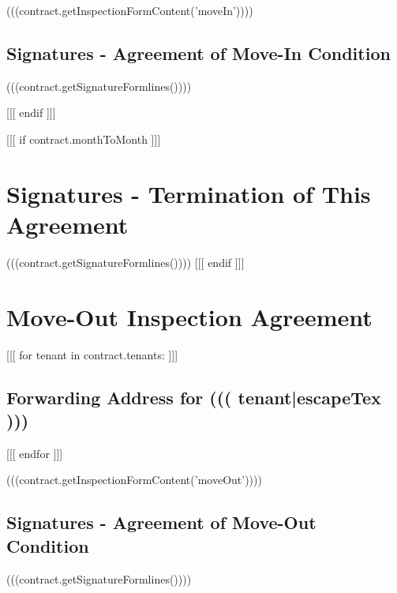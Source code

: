             (((contract.getInspectionFormContent('moveIn'))))
            
            \subsection{Signatures - Agreement of Move-In Condition}
                (((contract.getSignatureFormlines())))

    [[[ endif ]]]
    

    [[[ if contract.monthToMonth ]]]
        \pagebreak
        \section{Signatures - Termination of This Agreement}
            \label{terminationSignatures}
            (((contract.getSignatureFormlines())))
    [[[ endif ]]]

    \pagebreak
    \section{Move-Out Inspection Agreement}
        \label{moveOutInspection}

        [[[ for tenant in contract.tenants: ]]]
            \subsection{Forwarding Address for ((( tenant|escapeTex )))}
        [[[ endfor ]]]

        (((contract.getInspectionFormContent('moveOut'))))
            
        \subsection{Signatures - Agreement of Move-Out Condition}
            (((contract.getSignatureFormlines())))


